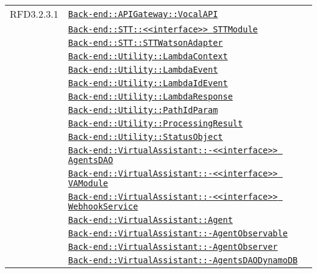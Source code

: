 \begin{longtable}{|>{\centering}m{3cm}|m{10cm}<{\centering}|}
RFD3.2.3.1 & \hyperref[Back-end::APIGateway::VocalAPI]{\texttt{Back-end::APIGateway::VocalAPI}}\\
& \hyperref[Back-end::STT::<<interface>> STTModule]{\texttt{Back-end::STT::<<interface>> STTModule}}\\
& \hyperref[Back-end::STT::STTWatsonAdapter]{\texttt{Back-end::STT::STTWatsonAdapter}}\\
& \hyperref[Back-end::Utility::LambdaContext]{\texttt{Back-end::Utility::LambdaContext}}\\
& \hyperref[Back-end::Utility::LambdaEvent]{\texttt{Back-end::Utility::LambdaEvent}}\\
& \hyperref[Back-end::Utility::LambdaIdEvent]{\texttt{Back-end::Utility::LambdaIdEvent}}\\
& \hyperref[Back-end::Utility::LambdaResponse]{\texttt{Back-end::Utility::LambdaResponse}}\\
& \hyperref[Back-end::Utility::PathIdParam]{\texttt{Back-end::Utility::PathIdParam}}\\
& \hyperref[Back-end::Utility::ProcessingResult]{\texttt{Back-end::Utility::ProcessingResult}}\\
& \hyperref[Back-end::Utility::StatusObject]{\texttt{Back-end::Utility::StatusObject}}\\
& \hyperref[Back-end::VirtualAssistant::<<interface>> AgentsDAO]{\texttt{Back-end::VirtualAssistant::-\linebreak <<interface>> AgentsDAO}}\\
& \hyperref[Back-end::VirtualAssistant::<<interface>> VAModule]{\texttt{Back-end::VirtualAssistant::-\linebreak <<interface>> VAModule}}\\
& \hyperref[Back-end::VirtualAssistant::<<interface>> WebhookService]{\texttt{Back-end::VirtualAssistant::-\linebreak <<interface>> WebhookService}}\\
& \hyperref[Back-end::VirtualAssistant::Agent]{\texttt{Back-end::VirtualAssistant::Agent}}\\
& \hyperref[Back-end::VirtualAssistant::AgentObservable]{\texttt{Back-end::VirtualAssistant::-\linebreak AgentObservable}}\\
& \hyperref[Back-end::VirtualAssistant::AgentObserver]{\texttt{Back-end::VirtualAssistant::-\linebreak AgentObserver}}\\
& \hyperref[Back-end::VirtualAssistant::AgentsDAODynamoDB]{\texttt{Back-end::VirtualAssistant::-\linebreak AgentsDAODynamoDB}}\\

\end{longtable}
